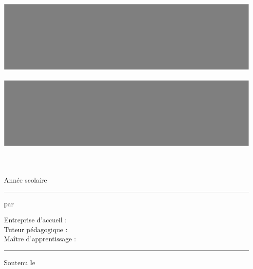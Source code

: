 \pagestyle{empty}

\begin{cover_page}

    \centering

    \begin{minipage}{0.3\textwidth}
        \includegraphics[width=\textwidth]{images/cover/logo_entreprise}
    \end{minipage}
    \hfill
    \begin{minipage}{0.3\textwidth}
        \includegraphics[width=\textwidth]{images/cover/logo_ecole}
    \end{minipage}

    \vspace{2 cm}

    {\LARGE{\titreSecondaire}} \\
    \vspace{0.5 cm}
    {\LARGE\textbf{\titrePrincipal}} \\
    \vspace{0.5 cm}
    \infoDiplome
    \vspace{0.5 cm}
    Année scolaire \anneeScolaire \\

    \vspace{1 cm}
    \rule{0.2\textwidth}{0.5pt}
    \vspace{1 cm}

    par \textbf{\nomAuteur} \\

    \vspace{0.5 cm}

    Entreprise d'accueil : \entrepriseAccueil \\
    Tuteur pédagogique : \tuteurPedagogique \\
    Maître d'apprentissage : \maitreApprentissage \\

    \vspace{1 cm}
    \rule{0.2\textwidth}{0.5pt}
    \vspace{1 cm}

    \descriptionMemoire

    \vspace{0.5 cm}

    Soutenu le \dateSoutenance \\

    \newpage

\end{cover_page}